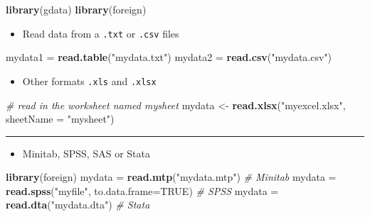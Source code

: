 \documentclass[]{article}
\def\tightlist{}
\newenvironment{Shaded}{\begin{snugshade}}{\end{snugshade}}
\newcommand{\KeywordTok}[1]{\textcolor[rgb]{0.13,0.29,0.53}{\textbf{{#1}}}}
\newcommand{\DataTypeTok}[1]{\textcolor[rgb]{0.13,0.29,0.53}{{#1}}}
\newcommand{\StringTok}[1]{\textcolor[rgb]{0.31,0.60,0.02}{{#1}}}
\newcommand{\CommentTok}[1]{\textcolor[rgb]{0.56,0.35,0.01}{\textit{{#1}}}}
\newcommand{\OtherTok}[1]{\textcolor[rgb]{0.56,0.35,0.01}{{#1}}}
\newcommand{\NormalTok}[1]{{#1}}
\numberwithin{equation}{section}
\begin{document}
\begin{Shaded}
\begin{Highlighting}[]
\KeywordTok{library}\NormalTok{(gdata)}
\KeywordTok{library}\NormalTok{(foreign)}
\end{Highlighting}
\end{Shaded}

\bigskip

\begin{itemize}
\tightlist
\item
  Read data from a \texttt{.txt} or \texttt{.csv} files
\end{itemize}

\begin{Shaded}
\begin{Highlighting}[]
\NormalTok{mydata1 =}\StringTok{ }\KeywordTok{read.table}\NormalTok{(}\StringTok{"mydata.txt"}\NormalTok{) }
\NormalTok{mydata2 =}\StringTok{ }\KeywordTok{read.csv}\NormalTok{(}\StringTok{"mydata.csv"}\NormalTok{)  }
\end{Highlighting}
\end{Shaded}

\begin{itemize}
\tightlist
\item
  Other formats \texttt{.xls} and \texttt{.xlsx}
\end{itemize}

\begin{Shaded}
\begin{Highlighting}[]
\CommentTok{# read in the worksheet named mysheet}
\NormalTok{mydata <-}\StringTok{ }\KeywordTok{read.xlsx}\NormalTok{(}\StringTok{"myexcel.xlsx"}\NormalTok{, }\DataTypeTok{sheetName =} \StringTok{"mysheet"}\NormalTok{)}
\end{Highlighting}
\end{Shaded}

\begin{center}\rule{0.5\linewidth}{\linethickness}\end{center}

\begin{itemize}
\tightlist
\item
  Minitab, SPSS, SAS or Stata
\end{itemize}

\begin{Shaded}
\begin{Highlighting}[]
\KeywordTok{library}\NormalTok{(foreign)                   }
\NormalTok{mydata =}\StringTok{ }\KeywordTok{read.mtp}\NormalTok{(}\StringTok{"mydata.mtp"}\NormalTok{)  }\CommentTok{# Minitab}
\NormalTok{mydata =}\StringTok{ }\KeywordTok{read.spss}\NormalTok{(}\StringTok{"myfile"}\NormalTok{, }\DataTypeTok{to.data.frame=}\OtherTok{TRUE}\NormalTok{) }\CommentTok{# SPSS}
\NormalTok{mydata =}\StringTok{ }\KeywordTok{read.dta}\NormalTok{(}\StringTok{"mydata.dta"}\NormalTok{) }\CommentTok{# Stata}
\end{Highlighting}
\end{Shaded}
\end{document}
